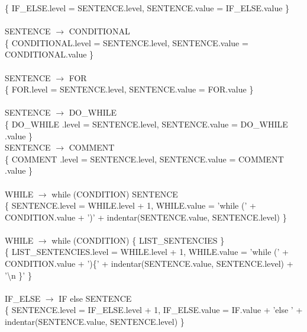 \documentclass[10pt,a4paper]{article}
\begin{document}
\{ IF\_ELSE.level = SENTENCE.level, SENTENCE.value = IF\_ELSE.value \}  \\ \\

SENTENCE $\rightarrow$  CONDITIONAL  \\ 

\{ CONDITIONAL.level = SENTENCE.level, SENTENCE.value = CONDITIONAL.value \}  \\ \\

SENTENCE $\rightarrow$  FOR \\ 

\{ FOR.level = SENTENCE.level, SENTENCE.value = FOR.value \}  \\ \\

SENTENCE $\rightarrow$  DO\_WHILE \\ 

\{ DO\_WHILE .level = SENTENCE.level, SENTENCE.value = DO\_WHILE .value \}  \\
  
SENTENCE $\rightarrow$  COMMENT \\ 

\{ COMMENT .level = SENTENCE.level, SENTENCE.value = COMMENT .value \}  \\ \\


WHILE $\rightarrow$ while (CONDITION) SENTENCE \\  

\{ SENTENCE.level = WHILE.level + 1, WHILE.value = 'while (' + CONDITION.value + ')' + indentar(SENTENCE.value, SENTENCE.level) \}  \\ \\

WHILE $\rightarrow$ while (CONDITION) \{ LIST\_SENTENCIES \}  \\

\{ LIST\_SENTENCIES.level = WHILE.level + 1, WHILE.value = 'while (' + CONDITION.value + ')\{' + indentar(SENTENCE.value, SENTENCE.level) + '\textbackslash{}n \}' \} \\ \\

IF\_ELSE $\rightarrow$ IF else SENTENCE   \\

\{ SENTENCE.level = IF\_ELSE.level + 1, IF\_ELSE.value = IF.value + 'else ' + indentar(SENTENCE.value, SENTENCE.level) \}  \\ \\
\end{document}
